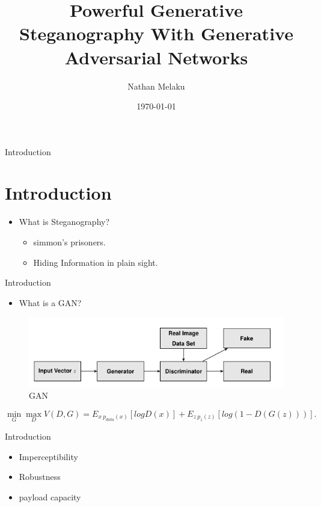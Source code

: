 \documentclass[11pt]{beamer}
\author{Nathan Melaku}
\title{Powerful Generative Steganography With Generative Adversarial Networks}
\institute{BahirDar Institute Of Technology}
\date{\today}
\begin{document}
\begin{frame}
	\titlepage
\end{frame}

\begin{frame}
\tableofcontents
\end{frame}

\begin{frame}{Introduction}
\section{Introduction}
	
\begin{itemize}
\item What is Steganography?
\begin{itemize}
	\item simmon's prisoners.
	\item Hiding Information in plain sight.
\end{itemize}
\end{itemize}
\end{frame}

\begin{frame}{Introduction}

\begin{itemize}
	\item What is a GAN?
\end{itemize}

\begin{figure}
	\includegraphics[scale=.45]{gan}
	\caption{GAN}
\end{figure}

$$
	\min_G\max_D V(D,G) = E_{x~p_{data}(x)}[log D(x)] + E_{z~p_z(z)}[log(1 - D(G(z)))].
$$

\end{frame}

\begin{frame}{Introduction}

	\begin{itemize}
		\item<1-> Imperceptibility 
		\item<2->  Robustness 
		\item<3->  payload capacity 
	\end{itemize}
\end{frame}
\end{document}

